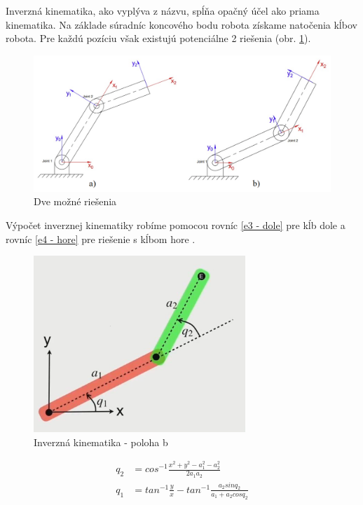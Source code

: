 Inverzná kinematika, ako vyplýva z názvu, spĺňa opačný účel ako priama kinematika. Na základe súradníc koncového bodu robota získame natočenia kĺbov robota. Pre každú pozíciu však existujú potenciálne 2 riešenia (obr. \ref{OBRAZOK 4.10}). 

\begin{figure}[h]
	\centering
	\includegraphics[width=140mm]{img/IK-EUED.png}
	\caption{Dve možné riešenia \cite{FK}} \label{OBRAZOK 4.10} 
\end{figure} 

Výpočet inverznej kinematiky robíme pomocou rovníc  \ref{e3 - dole} pre kĺb dole  a rovníc \ref{e4 - hore} pre riešenie s kĺbom hore  \cite{IK}.

\begin{figure}[h]
	\centering
	\includegraphics[width=80mm]{img/IK1.png}
	\caption{ Inverzná kinematika - poloha b \cite{IK}} \label{OBRAZOK 4.11} 
\end{figure} 

\begin{equation}
	\begin{aligned}
		q_2&= cos^{-1} \frac{x^2 + y^2 - a_1^2 - a_2^2}{2 a_1 a_2 }\\
		q_1&=  tan^{-1} \frac{y}{x} - tan^{-1} \frac{a_2 sinq_2}{a_1 + a_2 cos q_2} \\
	\end{aligned}
	\label{e3 - dole} 
\end{equation}

